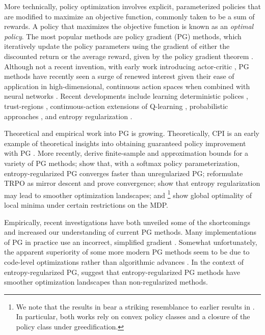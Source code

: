 \documentclass[\main/thesis.tex]{subfiles}
\begin{document}
More technically, policy optimization involves explicit, parameterized policies that are modified to maximize an objective function, commonly taken to be a sum of rewards. A policy that maximizes the objective function is known as an \textit{optimal policy}. The most popular methods are policy gradient (PG) methods, which iteratively update the policy parameters using the gradient of either the discounted return or the average reward, given by the {policy gradient theorem} \citep{sutton2000policy}.
Although not a recent invention, with early work introducing actor-critic \citep{sutton1984,konda2000actor}, PG methods have recently seen a surge of renewed interest given their ease of application in high-dimensional, continuous action spaces when combined with neural networks \citep{schulman2015high,wang2016sample,mnih2016asynchronous}. Recent developments include learning deterministic polices \citep{silver2014deterministic,lillicrap2015continuous}, trust-regions \citep{schulman2015trust,schulman2017proximal}, continuous-action extensions of Q-learning \citep{ haarnoja2017reinforcement,lim2018actor,ryu2019caql}, probabilistic approaches \citep{abdolmaleki2018maximum,fellows2019virel}, and entropy regularization \citep{ziebart2008maximum, ziebart2010modeling, rawlik2013stochastic, haarnoja2017reinforcement, haarnoja2018soft, levine2018reinforcement}.

Theoretical and empirical work into PG is growing. Theoretically, CPI \citep{kakade2002approximately} is an early example of theoretical insights into obtaining guaranteed policy improvement with PG . More recently, \citet{agarwal2019optimality} derive finite-sample and approximation bounds for a variety of PG methods; \citet{mei_global2020} show that, with a softmax policy parameterization, entropy-regularized PG converges faster than unregularized PG; \citet{neu2017unified,liu2019neural,shani2019adaptive} reformulate TRPO as mirror descent and prove convergence; \citet{ahmed2018understanding} show that entropy regularization may lead to smoother optimization landscapes; and \citet{bhandari2019global}\footnote{We note that the results in \citet{bhandari2019global} bear a striking resemblance to earlier results in \citet{scherrer2014local}. In particular, both works rely on convex policy classes and a closure of the policy class under greedification.} show global optimality of local minima under certain restrictions on the MDP.

Empirically, recent investigations have both unveiled some of the shortcomings and increased our understanding of current PG methods. Many implementations of PG in practice use an incorrect, simplified gradient \citep{thomas2014bias,imani2018off,nota2019policy}. Somewhat unfortunately, the apparent superiority of some more modern PG methods seem to be due to code-level optimizations rather than algorithmic advances \citep{ilyas2018deep,engstrom2019implementation}. In the context of entropy-regularized PG, \citep{ahmed2018understanding} suggest that entropy-regularized PG methods have smoother optimization landscapes than non-regularized methods. 
\end{document}

